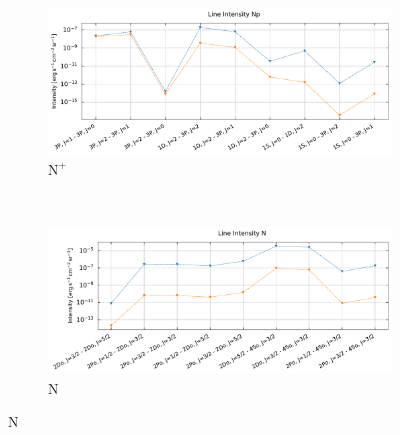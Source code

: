 \begin{figure}[!h]
    \centering
    \begin{subfigure}[t]{0.49\textwidth} %
        \centering \includegraphics[trim = {0 0 0 1cm},clip,width=1\textwidth]{figure/Cl/gridModelEmiss/I_comp_Np.pdf}
        \caption{$\mathrm{N}^+$}
    \end{subfigure}
    ~ 
   \begin{subfigure}[t]{0.49\textwidth} %
        \centering \includegraphics[trim = {0 0 0 1cm},clip,width=1\textwidth]{figure/Cl/gridModelEmiss/I_comp_N.pdf}
        \caption{$\mathrm{N}$}
    \end{subfigure}
    

\end{figure}
